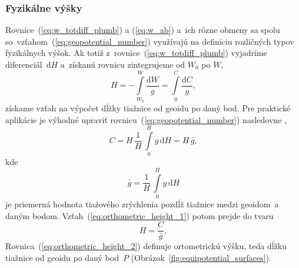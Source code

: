 \documentclass[a4paper,12pt]{book}
\newcommand{\diff}{\mathrm d}
\begin{document}
\subsubsection{Fyzikálne výšky}

Rovnice~(\ref{eq:w_totdiff_plumb}) a (\ref{eq:w_ab}) a~ich rôzne obmeny sa 
spolu so~vzťahom~(\ref{eq:geopotential_number}) využívajú na definíciu 
rozličných typov fyzikálnych výšok.  Ak totiž 
z~rovnice~(\ref{eq:w_totdiff_plumb}) vyjadríme diferenciál~$\diff H$ a~získanú 
rovnicu zintegrujeme od $W_0$ po $W$,
%
\begin{equation}
\label{eq:orthometric_height_1}
H = -\int\limits_{W_0}^{W} \frac{\diff W}{g} = \int\limits_{0}^{C} \frac{\diff 
C}{g}{,}
\end{equation}
%
získame vzťah na výpočet dĺžky tiažnice od geoidu po daný bod.  Pre praktické 
aplikácie je výhodné upraviť rovnicu~(\ref{eq:geopotential_number}) nasledovne 
\parencite{MoritzPhysicalGeodesy},
%
\begin{equation}
C = H \, \frac{1}{H} \, \int\limits_0^H g \, \diff H = H \, \bar{g}{,}
\end{equation}
%
kde
%
\begin{equation}
\bar{g} = \frac{1}{H} \, \int\limits_0^H g \, \diff H
\end{equation}
%
je priemerná hodnota tiažového zrýchlenia pozdĺž tiažnice medzi geoidom~a daným 
bodom.  Vzťah~(\ref{eq:orthometric_height_1}) potom prejde do tvaru
%
\begin{equation}
\label{eq:orthometric_height_2}
H = \frac{C}{\bar{g}}{,}
\end{equation}
%
Rovnica~(\ref{eq:orthometric_height_2}) definuje ortometrickú výšku, teda dĺžku 
tiažnice od geoidu po daný bod~$P$ (Obrázok~\ref{fig:equipotential_surfaces}).
\end{document}
